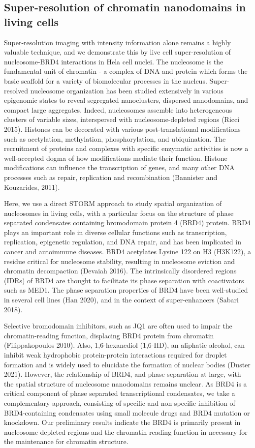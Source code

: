 \documentclass{ucetd}
\begin{document}
\subsection{Super-resolution of chromatin nanodomains in living cells}

Super-resolution imaging with intensity information alone remains a highly valuable technique, and we demonstrate this by live cell super-resolution of nucleosome-BRD4 interactions in Hela cell nuclei. The nucleosome is the fundamental unit of chromatin - a complex of DNA and protein which forms the basic scaffold for a variety of biomolecular processes in the nucleus. Super-resolved nucleosome organization has been studied extensively in various epigenomic states to reveal segregated nanoclusters, dispersed nanodomains, and compact large aggregates. Indeed, nucleosomes assemble into heterogeneous clusters of variable sizes, interspersed with nucleosome-depleted regions (Ricci 2015). Histones can be decorated with various post-translational modifications such as acetylation, methylation, phosphorylation, and ubiquination. The recruitment of proteins and complexes with specific enzymatic activities is now a well-accepted dogma of how modifications mediate their function. Histone modifications can influence the transcription of genes, and many other DNA processes such as repair, replication and recombination (Bannister and Kouzarides, 2011). 

Here, we use a direct STORM approach to study spatial organization of nucleosomes in living cells, with a particular focus on the structure of phase separated condensates containing bromodomain protein 4 (BRD4) protein. BRD4 plays an important role in diverse cellular functions such as transcription, replication, epigenetic regulation, and DNA repair, and has been implicated in cancer and autoimmune diseases. BRD4 acetylates Lysine 122 on H3 (H3K122), a residue critical for nucleosome stability, resulting in nucleosome eviction and chromatin decompaction (Devaiah 2016). The intrinsically disordered regions (IDRs) of BRD4 are thought to facilitate its phase separation with coactivators such as MED1. The phase separation properties of BRD4 have been well-studied in several cell lines (Han 2020), and in the context of super-enhancers (Sabari 2018).

Selective bromodomain inhibitors, such as JQ1 are often used to impair the chromatin-reading function, displacing BRD4 protein from chromatin (Filippakopoulos 2010). Also, 1,6-hexanediol (1,6-HD), an aliphatic alcohol, can inhibit weak hydrophobic protein-protein interactions required for droplet formation and is widely used to elucidate the formation of nuclear bodies (Duster 2021). However, the relationship of BRD4, and phase separation at large, with the spatial structure of nucleosome nanodomains remains unclear. As BRD4 is a critical component of phase separated transcriptional condensates, we take a complementary approach, consisting of specific and non-specific inhibition of BRD4-containing condensates using small molecule drugs and BRD4 mutation or knockdown. Our preliminary results indicate the BRD4 is primarily present in nucleosome depleted regions and the chromatin reading function in necessary for the maintenance for chromatin structure.
\end{document}
